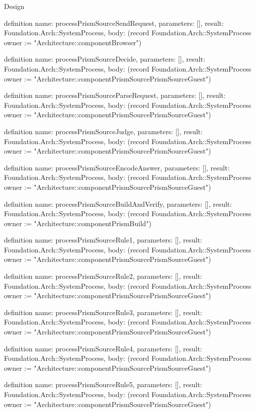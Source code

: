\begin{lexlean}{Design}
\begin{semanticmodule}
definition{
  name: processPrismSourceSendRequest,
  parameters: [],
  result: Foundation.Arch::SystemProcess,
  body: (record Foundation.Arch::SystemProcess {owner := "Architecture::componentBrowser"})
}

definition{
  name: processPrismSourceDecide,
  parameters: [],
  result: Foundation.Arch::SystemProcess,
  body: (record Foundation.Arch::SystemProcess {owner := "Architecture::componentPrismSourcePrismSourceGuest"})
}

definition{
  name: processPrismSourceParseRequest,
  parameters: [],
  result: Foundation.Arch::SystemProcess,
  body: (record Foundation.Arch::SystemProcess {owner := "Architecture::componentPrismSourcePrismSourceGuest"})
}

definition{
  name: processPrismSourceJudge,
  parameters: [],
  result: Foundation.Arch::SystemProcess,
  body: (record Foundation.Arch::SystemProcess {owner := "Architecture::componentPrismSourcePrismSourceGuest"})
}

definition{
  name: processPrismSourceEncodeAnswer,
  parameters: [],
  result: Foundation.Arch::SystemProcess,
  body: (record Foundation.Arch::SystemProcess {owner := "Architecture::componentPrismSourcePrismSourceGuest"})
}

definition{
  name: processPrismSourceBuildAndVerify,
  parameters: [],
  result: Foundation.Arch::SystemProcess,
  body: (record Foundation.Arch::SystemProcess {owner := "Architecture::componentPrismBuild"})
}

definition{
  name: processPrismSourceRule1,
  parameters: [],
  result: Foundation.Arch::SystemProcess,
  body: (record Foundation.Arch::SystemProcess {owner := "Architecture::componentPrismSourcePrismSourceGuest"})
}

definition{
  name: processPrismSourceRule2,
  parameters: [],
  result: Foundation.Arch::SystemProcess,
  body: (record Foundation.Arch::SystemProcess {owner := "Architecture::componentPrismSourcePrismSourceGuest"})
}

definition{
  name: processPrismSourceRule3,
  parameters: [],
  result: Foundation.Arch::SystemProcess,
  body: (record Foundation.Arch::SystemProcess {owner := "Architecture::componentPrismSourcePrismSourceGuest"})
}

definition{
  name: processPrismSourceRule4,
  parameters: [],
  result: Foundation.Arch::SystemProcess,
  body: (record Foundation.Arch::SystemProcess {owner := "Architecture::componentPrismSourcePrismSourceGuest"})
}

definition{
  name: processPrismSourceRule5,
  parameters: [],
  result: Foundation.Arch::SystemProcess,
  body: (record Foundation.Arch::SystemProcess {owner := "Architecture::componentPrismSourcePrismSourceGuest"})
}


\end{semanticmodule}
\end{lexlean}
